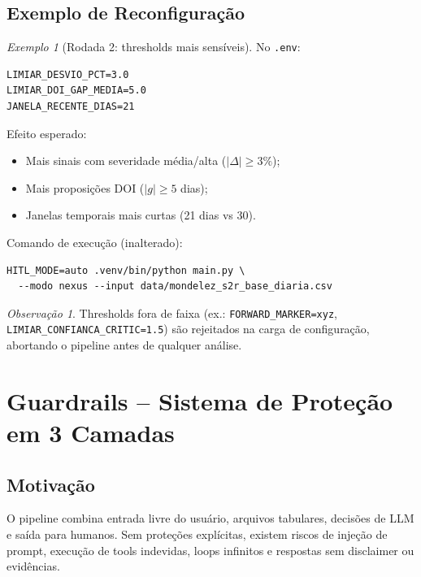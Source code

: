 \documentclass[a4paper, 12pt]{report}
\theoremstyle{definition}
\theoremstyle{remark}
\newtheorem{observacao}{Observa\c{c}\~ao}[chapter]
\newtheorem{exemplo}{Exemplo}[chapter]
\begin{document}
\section{Exemplo de Reconfigura\c{c}\~ao}

\begin{exemplo}[Rodada 2: thresholds mais sens\'iveis]
  No \texttt{.env}:
  \begin{verbatim}
LIMIAR_DESVIO_PCT=3.0
LIMIAR_DOI_GAP_MEDIA=5.0
JANELA_RECENTE_DIAS=21
  \end{verbatim}
  Efeito esperado:
  \begin{itemize}
    \item Mais sinais com severidade m\'edia/alta ($|\Delta| \geq 3\%$);
    \item Mais proposi\c{c}\~oes DOI ($|g| \geq 5$ dias);
    \item Janelas temporais mais curtas (21 dias vs 30).
  \end{itemize}
  Comando de execu\c{c}\~ao (inalterado):
  \begin{verbatim}
HITL_MODE=auto .venv/bin/python main.py \
  --modo nexus --input data/mondelez_s2r_base_diaria.csv
  \end{verbatim}
\end{exemplo}

\begin{observacao}
  Thresholds fora de faixa (ex.: \texttt{FORWARD\_MARKER=xyz},
  \texttt{LIMIAR\_CONFIANCA\_CRITIC=1.5}) s\~ao rejeitados na carga
  de configura\c{c}\~ao, abortando o pipeline antes de qualquer an\'alise.
\end{observacao}


\chapter{Guardrails -- Sistema de Prote\c{c}\~ao em 3 Camadas}

\section{Motiva\c{c}\~ao}

O pipeline combina entrada livre do usu\'ario, arquivos tabulares,
decis\~oes de LLM e sa\'ida para humanos. Sem prote\c{c}\~oes expl\'icitas,
existem riscos de inje\c{c}\~ao de prompt, execu\c{c}\~ao de tools indevidas,
loops infinitos e respostas sem disclaimer ou evid\^encias.
\end{document}
